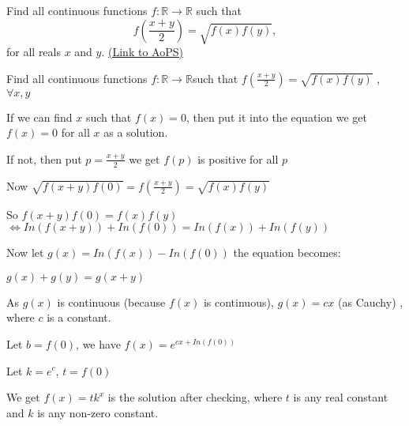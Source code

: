 \begin{problem}
	Find all continuous functions $ f: \mathbb{R} \to \mathbb{R}$ such that \[ f\left( {\frac {{x + y}} {2}} \right) = \sqrt {f(x)f(y)},\] for all reals $x$ and $y$.
	\flushright \href{https://artofproblemsolving.com/community/c6h277431}{(Link to AoPS)}
\end{problem}



\begin{solution}
	\begin{tcolorbox}Find all continuous functions $ f: \mathbb{R} \to \mathbb{R}$such that $ f\left( {\frac {{x + y}} {2}} \right) = \sqrt {f(x)f(y)}$      , $ \forall x,y$\end{tcolorbox}

If we can find $ x$ such that $ f(x)=0$, then put it into the equation we get $ f(x)=0$ for all $ x$ as a solution.

If not, then put $ p=\frac{x+y}{2}$ we get $ f(p)$ is positive for all $ p$


Now $ \sqrt{f(x+y)f(0)}=f(\frac{x+y}{2})=\sqrt{f(x)f(y)}$

So $ f(x+y)f(0)=f(x)f(y)$
$ \Leftrightarrow In (f(x+y))+In (f(0))=In (f(x))+In(f(y))$

Now let $ g(x)=In (f(x))-In (f(0))$ the equation becomes:

$ g(x)+g(y)=g(x+y)$

As $ g(x)$ is continuous (because $ f(x)$ is continuous), $ g(x)=cx$ (as Cauchy) , where $ c$ is a constant.

Let $ b=f(0)$, we have $ f(x)=e^{cx+In(f(0))}$

Let $ k=e^c$, $ t=f(0)$


We get $ f(x)=tk^x$ is the solution after checking, where $ t$ is any real constant and $ k$ is any non-zero constant.
\end{solution}



